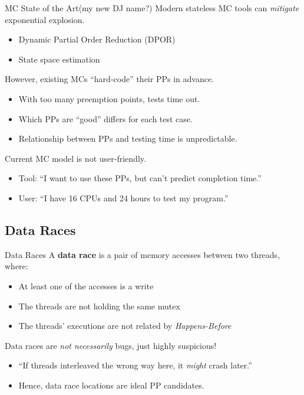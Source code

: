 \documentclass[xcolor=dvipsnames]{beamer}
\begin{document}
\begin{frame}{MC State of the Art}{(my new DJ name?)}
	Modern stateless MC tools can {\em mitigate} exponential explosion.
	\begin{itemize}
		\item Dynamic Partial Order Reduction (DPOR)
		\item State space estimation
	\end{itemize}
	\linegap

	However, existing MCs ``hard-code'' their PPs in advance.
	\begin{itemize}
		\item With too many preemption points, tests time out.
		\item Which PPs are ``good'' differs for each test case.
		\item Relationship between PPs and testing time is unpredictable.
	\end{itemize}
	\linegap

	Current MC model is not user-friendly.
	\begin{itemize}
		\item Tool: ``I want to use these PPs, but can't predict completion time.''
		\item User: ``I have 16 CPUs and 24 hours to test my program.''
	\end{itemize}
\end{frame}


\subsection{Data Races}

\begin{frame}{Data Races}
	A {\bf data race} is a pair of memory accesses between two threads, where:
	\begin{itemize}
		\item At least one of the accesses is a write
		\item The threads are not holding the same mutex
		\item The threads' executions are not related by {\em Happens-Before}
	\end{itemize}

	Data races are {\em not necessarily} bugs, just highly suspicious!
	\begin{itemize}
		\item ``If threads interleaved the wrong way here, it {\em might} crash later.''
		\item Hence, data race locations are ideal PP candidates.
	\end{itemize}
\end{frame}
\end{document}
